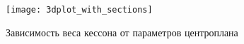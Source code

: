 \begin{figure}[ht]
\captionsetup{justification=centering}
\caption{Зависимость веса кессона от параметров центроплана}
\texttt{[image: 3dplot\_with\_sections]}
\label{fig:Optimization3dplot}
\end{figure}


